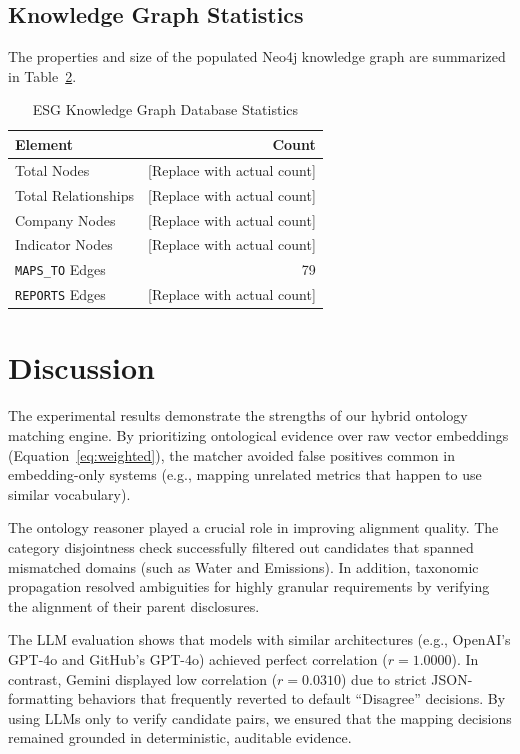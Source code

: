 \documentclass[journal,compsoc]{IEEEtran}
\begin{document}
\begin{itemize}
\begin{table}[t]
\subsection{Knowledge Graph Statistics}
The properties and size of the populated Neo4j knowledge graph are summarized in Table~\ref{tab:kg_stats}.

\begin{table}[h]
\centering
\caption{ESG Knowledge Graph Database Statistics}
\label{tab:kg_stats}
\begin{tabular}{lr}
\toprule
\textbf{Element} & \textbf{Count} \\
\midrule
Total Nodes & [Replace with actual count] \\
Total Relationships & [Replace with actual count] \\
Company Nodes & [Replace with actual count] \\
Indicator Nodes & [Replace with actual count] \\
\texttt{MAPS\_TO} Edges & 79 \\
\texttt{REPORTS} Edges & [Replace with actual count] \\
\bottomrule
\end{tabular}
\end{table}

\section{Discussion}
The experimental results demonstrate the strengths of our hybrid ontology matching engine. By prioritizing ontological evidence over raw vector embeddings (Equation~\ref{eq:weighted}), the matcher avoided false positives common in embedding-only systems (e.g., mapping unrelated metrics that happen to use similar vocabulary). 

The ontology reasoner played a crucial role in improving alignment quality. The category disjointness check successfully filtered out candidates that spanned mismatched domains (such as Water and Emissions). In addition, taxonomic propagation resolved ambiguities for highly granular requirements by verifying the alignment of their parent disclosures.

The LLM evaluation shows that models with similar architectures (e.g., OpenAI's GPT-4o and GitHub's GPT-4o) achieved perfect correlation ($r = 1.0000$). In contrast, Gemini displayed low correlation ($r = 0.0310$) due to strict JSON-formatting behaviors that frequently reverted to default ``Disagree'' decisions. By using LLMs only to verify candidate pairs, we ensured that the mapping decisions remained grounded in deterministic, auditable evidence.


\end{table}
\end{itemize}
\end{document}
